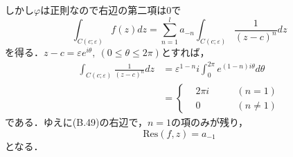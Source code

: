 しかし$\varphi$は正則なので右辺の第二項は$0$で
\begin{equation}
  \int_{C(c;\varepsilon)}f(z)dz = \sum_{n = 1}^{l}a_{-n}\int_{C(c;\varepsilon)}\frac{1}{(z - c)^{n}}dz
\end{equation}
を得る．$z-c = \varepsilon e^{i\theta},\ (0\leq \theta \leq 2\pi)$とすれば，
\begin{align}
  \int_{C(c;\varepsilon)}\frac{1}{(z - c)^{n}}dz 
  &= \varepsilon^{1-n}i\int_{0}^{2\pi}e^{(1 - n)i\theta}d\theta\\
  &= \left\{
  \begin{alignedat}{2}
    &2\pi i \qquad &(n = 1)\\
    &0\qquad &(n \neq 1)
  \end{alignedat}
  \right.
\end{align}
である．ゆえに(B.49)の右辺で，$n = 1$の項のみが残り，
\begin{equation}
  \text{Res}(f,z) = a_{-1}
\end{equation}
となる．


